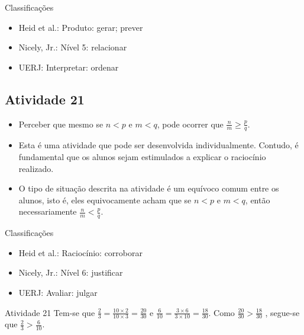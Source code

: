 \begin{multicols}{2}
  Classificações  
\begin{itemize} %
    \item       Heid et al.: Produto: gerar; prever
    \item       Nicely, Jr.: Nível 5: relacionar
    \item       UERJ: Interpretar: ordenar
\end{itemize} %
  
  \pagebreak
  
\subsection{Atividade 21}

\begin{itemize} %
    \item       Perceber que mesmo se       $n < p$       e       $m < q$, pode 
ocorrer que       $\frac{n}{m} \geq \frac{p}{q}$.
\end{itemize} %
  
  
  
\begin{itemize} %
    \item       Esta é uma atividade que pode ser desenvolvida individualmente. 
Contudo, é fundamental que os alunos sejam estimulados a explicar o raciocínio 
realizado.
    \item       O tipo de situação descrita na atividade é um equívoco comum 
entre os alunos, isto é, eles equivocamente acham que se       $n < p$       e   
    $m < q$, então necessariamente       $\frac{n}{m} < \frac{p}{q}$.
\end{itemize} %
  
  
  Classificações  
\begin{itemize} %
    \item       Heid et al.: Raciocínio: corroborar
    \item       Nicely, Jr.: Nível 6: justificar
    \item       UERJ: Avaliar: julgar
\end{itemize} %

\begin{resposta*}{Atividade 21}
  Tem-se que   $\frac{2}{3} = \frac{10 \times 2}{10 \times 3} = \frac{20}{30}$   
e  
  $\frac{6}{10} = \frac{3 \times 6}{3 \times 10} = \frac{18}{30}$.  
  Como   $\frac{20}{30} > \frac{18}{30}$  , segue-se que   $\frac{2}{3} > 
\frac{6}{10}$.  
\end{resposta*}


\end{multicols}
